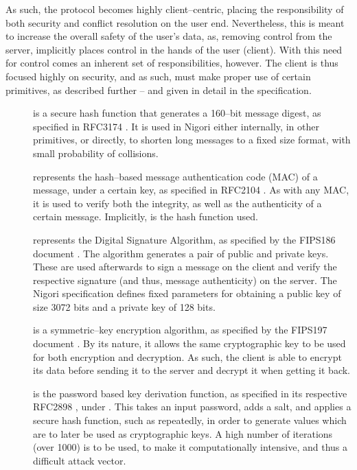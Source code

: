 
As such, the protocol becomes highly client--centric, placing the responsibility of both security and conflict resolution on the user end.
Nevertheless, this is meant to increase the overall safety of the user's data, as, removing control from the server, implicitly places control in the hands of the user (client).
With this need for control comes an inherent set of responsibilities, however.
The client is thus focused highly on security, and as such, must make proper use of certain primitives, as described further -- and given in detail in the specification.
\begin{description}
  \item[] is a secure hash function that generates a 160--bit message digest, as specified in RFC3174 \cite{RFC3174}.
  It is used in Nigori either internally, in other primitives, or directly, to shorten long messages to a fixed size format, with small probability of collisions.

  \item[] represents the hash--based message authentication code (MAC) of a message, under a certain key, as specified in RFC2104 \cite{RFC2104}.
  As with any MAC, it is used to verify both the integrity, as well as the authenticity of a certain message.
  Implicitly,  is the hash function used.

  \item[] represents the Digital Signature Algorithm, as specified by the FIPS186 document \cite{DSA}.
  The algorithm generates a pair of public and private keys.
  These are used afterwards to sign a message on the client and verify the respective signature (and thus, message authenticity) on the server.
  The Nigori specification defines fixed parameters for obtaining a public key of size 3072 bits and a private key of 128 bits.

  \item[] is a symmetric--key encryption algorithm, as specified by the FIPS197 document \cite{AES}.
  By its nature, it allows the same cryptographic key to be used for both encryption and decryption.
  As such, the client is able to encrypt its data before sending it to the server and decrypt it when getting it back.

  \item[] is the password based key derivation function, as specified in its respective RFC2898 \cite{RFC2898}, under .
  This takes an input password, adds a salt, and applies a secure hash function, such as  repeatedly, in order to generate values which are to later be used as cryptographic keys.
  A high number of iterations (over 1000) is to be used, to make it computationally intensive, and thus a difficult attack vector.
\end{description}

